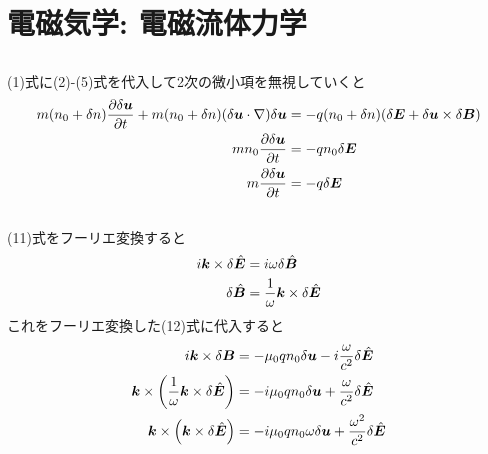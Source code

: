 \documentclass[../ap_2009.tex]{subfiles}
\begin{document}
\chapter{電磁気学: 電磁流体力学}
\section{}
(1)式に(2)-(5)式を代入して2次の微小項を無視していくと
\begin{equation}\begin{aligned}[b]
    m(n_0+\delta n)\pdv{\delta\vb*{u}}{t}
        +m(n_0+\delta n)\qty(\delta\vb*{u}\cdot\nabla)\delta\vb*{u}
        &= -q(n_0+\delta n)\qty(\delta\vb*{E}+\delta\vb*{u}\times\delta\vb*{B})\\
    mn_0\pdv{\delta\vb*{u}}{t}
        &= -qn_0\delta\vb*{E}\\
    m\pdv{\delta\vb*{u}}{t}
        &= -q\delta\vb*{E}
\end{aligned}\end{equation}

\section{}
(11)式をフーリエ変換すると
\begin{equation}\begin{aligned}[b]
    i\vb*{k}\times\delta\hat{\vb*{E}} &= i\omega\delta\hat{\vb*{B}}\\
    \delta\hat{\vb*{B}} &= \frac{1}{\omega}\vb*{k}\times\delta\hat{\vb*{E}}
\end{aligned}\end{equation}
これをフーリエ変換した(12)式に代入すると
\begin{equation}\begin{aligned}[b]
    i\vb*{k}\times\delta\vb*{B} &= -\mu_0qn_0\delta\vb*{u}-i\frac{\omega}{c^2}\delta\hat{\vb*{E}}\\
    \vb*{k}\times\qty(\frac{1}{\omega}\vb*{k}\times\delta\hat{\vb*{E}})
        &= -i\mu_0qn_0\delta\vb*{u}+\frac{\omega}{c^2}\delta\hat{\vb*{E}}\\
    \vb*{k}\times\qty(\vb*{k}\times\delta\hat{\vb*{E}})
        &= -i\mu_0qn_0\omega\delta\vb*{u}+\frac{\omega^2}{c^2}\delta\hat{\vb*{E}}\\
\end{aligned}\end{equation}
\end{document}
